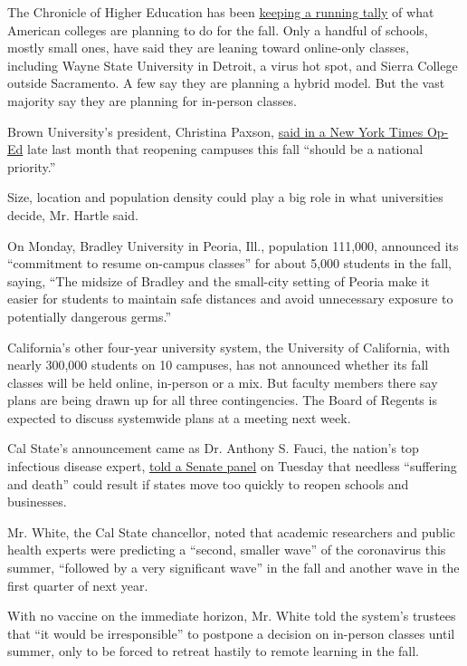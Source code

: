 The Chronicle of Higher Education has been
\href{https://www.chronicle.com/article/Here-s-a-List-of-Colleges-/248626}{keeping
a running tally} of what American colleges are planning to do for the
fall. Only a handful of schools, mostly small ones, have said they are
leaning toward online-only classes, including Wayne State University in
Detroit, a virus hot spot, and Sierra College outside Sacramento. A few
say they are planning a hybrid model. But the vast majority say they are
planning for in-person classes.

Brown University's president, Christina Paxson,
\href{https://www.nytimes.com/2020/04/26/opinion/coronavirus-colleges-universities.html}{said
in a New York Times Op-Ed} late last month that reopening campuses this
fall ``should be a national priority.''

Size, location and population density could play a big role in what
universities decide, Mr. Hartle said.

On Monday, Bradley University in Peoria, Ill., population 111,000,
announced its ``commitment to resume on-campus classes'' for about 5,000
students in the fall, saying, ``The midsize of Bradley and the
small-city setting of Peoria make it easier for students to maintain
safe distances and avoid unnecessary exposure to potentially dangerous
germs.''

California's other four-year university system, the University of
California, with nearly 300,000 students on 10 campuses, has not
announced whether its fall classes will be held online, in-person or a
mix. But faculty members there say plans are being drawn up for all
three contingencies. The Board of Regents is expected to discuss
systemwide plans at a meeting next week.

Cal State's announcement came as Dr. Anthony S. Fauci, the nation's top
infectious disease expert,
\href{https://www.nytimes.com/2020/05/12/us/politics/fauci-cdc-coronavirus-senate-testimony.html?action=click\&module=Spotlight\&pgtype=Homepage}{told
a Senate panel} on Tuesday that needless ``suffering and death'' could
result if states move too quickly to reopen schools and businesses.

Mr. White, the Cal State chancellor, noted that academic researchers and
public health experts were predicting a ``second, smaller wave'' of the
coronavirus this summer, ``followed by a very significant wave'' in the
fall and another wave in the first quarter of next year.

With no vaccine on the immediate horizon, Mr. White told the system's
trustees that ``it would be irresponsible'' to postpone a decision on
in-person classes until summer, only to be forced to retreat hastily to
remote learning in the fall.

